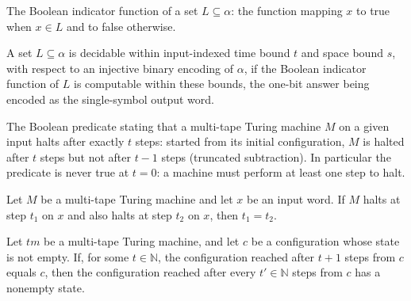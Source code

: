 \begin{definition}
\label{Turing.MultiTapeTM.indicator}
\leanok
The Boolean indicator function of a set $L \subseteq \alpha$: the function
mapping $x$ to true when $x \in L$ and to false otherwise.
\end{definition}

\begin{definition}
\label{Turing.MultiTapeTM.DecidableInTimeAndSpace}
\leanok
{}
A set $L \subseteq \alpha$ is decidable within input-indexed time bound $t$
and space bound $s$, with respect to an injective binary encoding of $\alpha$,
if the Boolean indicator function of $L$ is computable within these bounds,
the one-bit answer being encoded as the single-symbol output word.
\end{definition}

\begin{definition}
\label{Turing.MultiTapeTM.haltsAtStep}
\leanok
{}
The Boolean predicate stating that a multi-tape Turing machine $M$ on a given
input halts after exactly $t$ steps: started from its initial configuration,
$M$ is halted after $t$ steps but not after $t - 1$ steps (truncated
subtraction).  In particular the predicate is never true at $t = 0$: a machine
must perform at least one step to halt.
\end{definition}

\begin{lemma}
\label{Turing.MultiTapeTM.halting_step_unique}
\leanok
{}
Let $M$ be a multi-tape Turing machine and let $x$ be an input word. If $M$ halts at
step $t_1$ on $x$ and also halts at step $t_2$ on $x$, then $t_1=t_2$.
\end{lemma}

\begin{lemma}
\label{Turing.MultiTapeTM.not_halts_of_repeat_nonhalt}
\leanok
{}
Let $tm$ be a multi-tape Turing machine, and let $c$ be a configuration whose state is
not empty. If, for some $t\in\mathbb{N}$, the configuration reached after $t+1$ steps
from $c$ equals $c$, then the configuration reached after every $t'\in\mathbb{N}$
steps from $c$ has a nonempty state.
\end{lemma}

